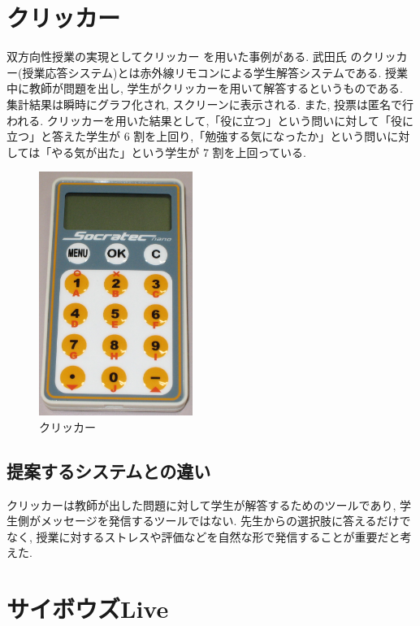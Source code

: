 \documentclass{funthesis}
\begin{document}
\section{クリッカー }
双方向性授業の実現としてクリッカー\cite{A5} を用いた事例がある. 武田氏\cite{A2} のクリッカー(授業応答システム)とは赤外線リモコンによる学生解答システムである. 授業中に教師が問題を出し, 学生がクリッカーを用いて解答するというものである. 集計結果は瞬時にグラフ化され, スクリーンに表示される. また, 投票は匿名で行われる. クリッカーを用いた結果として,「役に立つ」という問いに対して「役に立つ」と答えた学生が 6 割を上回り,「勉強する気になったか」という問いに対しては「やる気が出た」という学生が 7 割を上回っている.
\begin{figure}[H]
  \begin{center}
  \includegraphics[width=50mm]{./img/clicker.jpg}
  \end{center}
  \caption{クリッカー}
  \label{senni1}
 \end{figure}

\subsection{提案するシステムとの違い}
クリッカーは教師が出した問題に対して学生が解答するためのツールであり, 学生側がメッセージを発信するツールではない.  先生からの選択肢に答えるだけでなく, 授業に対するストレスや評価などを自然な形で発信することが重要だと考えた. 


\section{サイボウズLive \cite{A3} }

\end{document}
